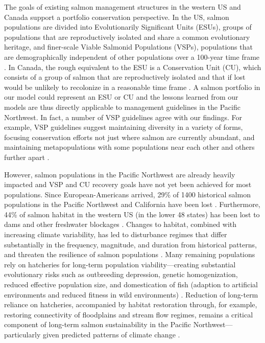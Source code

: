 The goals of existing salmon management structures in the western US and Canada support a portfolio conservation perspective. In the US, salmon populations are divided into Evolutionarily Significant Units (ESUs), groups of populations that are reproductively isolated and share a common evolutionary heritage, and finer-scale Viable Salmonid Populations (VSPs), populations that are demographically independent of other populations over a 100-year time frame \citep{mcelhany2000}. In Canada, the rough equivalent to the ESU is a Conservation Unit (CU), which consists of a group of salmon that are reproductively isolated and that if lost would be unlikely to recolonize in a reasonable time frame \citep{dfo2005wsp}. A salmon portfolio in our model could represent an ESU or CU and the lessons learned from our models are thus directly applicable to management guidelines in the Pacific Northwest. In fact, a number of VSP guidelines agree with our findings. For example, VSP guidelines suggest maintaining diversity in a variety of forms, focusing conservation efforts not just where salmon are currently abundant, and maintaining metapopulations with some populations near each other and others further apart \citep{mcelhany2000}.

However, salmon populations in the Pacific Northwest are already heavily impacted \citep[e.g.][]{gustafson2007} and VSP and CU recovery goals have not yet been achieved for most populations. Since European-Americans arrived, 29\% of 1400 historical salmon populations in the Pacific Northwest and California have been lost \citep{gustafson2007}. Furthermore, 44\% of salmon habitat in the western US (in the lower 48 states) has been lost to dams and other freshwater blockages \citep{mcclure2008a}. Changes to habitat, combined with increasing climate variability, has led to disturbance regimes that differ substantially in the frequency, magnitude, and duration from historical patterns, and threaten the resilience of salmon populations \citep{waples2009}. Many remaining populations rely on hatcheries for long-term population viability---creating substantial evolutionary risks such as outbreeding depression, genetic homogenization, reduced effective population size, and domestication of fish (adaption to artificial environments and reduced fitness in wild environments) \citep{mcclure2008b}. Reduction of long-term reliance on hatcheries, accompanied by habitat restoration through, for example, restoring connectivity of floodplains and stream flow regimes, remains a critical component of long-term salmon sustainability in the Pacific Northwest---particularly given predicted patterns of climate change \citep{beechie2013}.


